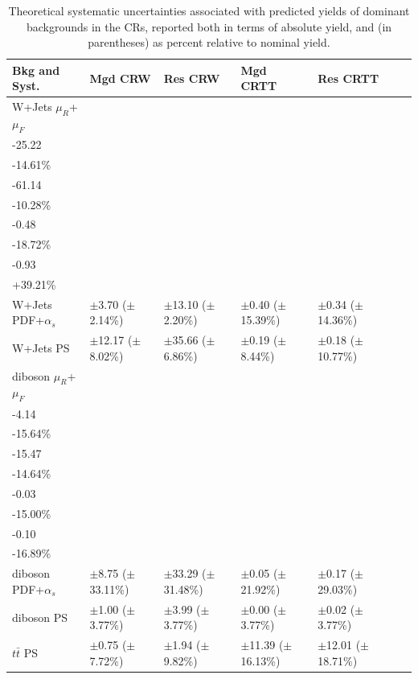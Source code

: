 \begin{table}[ht]
\footnotesize{
\caption{\label{tab:systs_bkg_CR} Theoretical systematic uncertainties associated with predicted yields of dominant backgrounds in the CRs, reported both in terms of absolute yield, and (in parentheses) as percent relative to nominal yield.}
\begin{tabular}{l l l l l l l }
\toprule
\textbf{Bkg and Syst.} & \textbf{Mgd CRW} & \textbf{Res CRW} & \textbf{Mgd CRTT} & \textbf{Res CRTT}\tabularnewline
\midrule
\midrule
W+Jets \(\mu_R\)+\(\mu_F\) & \(\substack{+42.91\\-25.22}\) \big(\(\substack{+24.86\%\\-14.61\%}\)\big) & \(\substack{+36.17\\-61.14}\) \big(\(\substack{+6.08\%\\-10.28\%}\)\big) & \(\substack{+3.55\\-0.48}\) \big(\(\substack{+137.61\%\\-18.72\%}\)\big) & \(\substack{+6.27\\-0.93}\) \big(\(\substack{-262.80\%\\+39.21\%}\)\big) \tabularnewline
\midrule
W+Jets PDF+\(\alpha_s\) & \(\pm\)3.70 (\(\pm\)2.14\%) &\(\pm\)13.10 (\(\pm\)2.20\%) &\(\pm\)0.40 (\(\pm\)15.39\%) &\(\pm\)0.34 (\(\pm\)14.36\%) \tabularnewline
\midrule
W+Jets PS & \(\pm\)12.17 (\(\pm\)8.02\%) &\(\pm\)35.66 (\(\pm\)6.86\%) &\(\pm\)0.19 (\(\pm\)8.44\%) &\(\pm\)0.18 (\(\pm\)10.77\%) \tabularnewline
\midrule
diboson \(\mu_R\)+\(\mu_F\) & \(\substack{+1.02\\-4.14}\) \big(\(\substack{+3.84\%\\-15.64\%}\)\big) & \(\substack{+18.40\\-15.47}\) \big(\(\substack{+17.40\%\\-14.64\%}\)\big) & \(\substack{+0.04\\-0.03}\) \big(\(\substack{+19.96\%\\-15.00\%}\)\big) & \(\substack{+0.13\\-0.10}\) \big(\(\substack{+22.85\%\\-16.89\%}\)\big) \tabularnewline
\midrule
diboson PDF+\(\alpha_s\) & \(\pm\)8.75 (\(\pm\)33.11\%) &\(\pm\)33.29 (\(\pm\)31.48\%) &\(\pm\)0.05 (\(\pm\)21.92\%) &\(\pm\)0.17 (\(\pm\)29.03\%) \tabularnewline
\midrule
diboson PS & \(\pm\)1.00 (\(\pm\)3.77\%) &\(\pm\)3.99 (\(\pm\)3.77\%) &\(\pm\)0.00 (\(\pm\)3.77\%) &\(\pm\)0.02 (\(\pm\)3.77\%) \tabularnewline
\midrule
\(t\bar{t}\) PS & \(\pm\)0.75 (\(\pm\)7.72\%) &\(\pm\)1.94 (\(\pm\)9.82\%) &\(\pm\)11.39 (\(\pm\)16.13\%) &\(\pm\)12.01 (\(\pm\)18.71\%) \tabularnewline

\end{tabular}}
\end{table}
